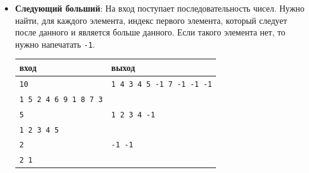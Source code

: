 \documentclass{article}
\begin{document}
\begin{itemize}
\item \textbf{Следующий больший}: На вход поступает последовательность чисел. Нужно найти, для каждого элемента, индекс первого элемента, который следует после данного и является больше данного. Если такого элемента нет, то нужно напечатать \texttt{-1}.
\begin{center}
\begin{tabular}{ l | l }
 вход & выход \\ \hline
 \texttt{10} &  \texttt{1 4 3 4 5 -1 7 -1 -1 -1}\\
 \texttt{1 5 2 4 6 9 1 8 7 3} & \\ \hline
 
 \texttt{5} &  \texttt{1 2 3 4 -1}\\
 \texttt{1 2 3 4 5} & \\ \hline
 
  \texttt{2} &  \texttt{-1 -1}\\
 \texttt{2 1} & \\
\end{tabular}
\end{center}

\end{itemize}
\end{document}
